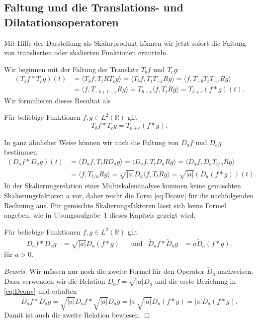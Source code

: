 \subsection{Faltung und die Translations- und Dilatationsoperatoren
\label{subsection:translation-und-dialatation}}
Mit Hilfe der Darstellung als Skalarprodukt können wir jetzt sofort
die Faltung von translierten oder skalierten Funktionen ermitteln.

Wir beginnen mit der Faltung der Translate $T_bf$ und $T_cg$:
\begin{align*}
(T_bf * T_cg)(t)
&=
\langle T_bf, T_tRT_cg\rangle
=
\langle T_bf, T_tT_{-c}Rg\rangle
=
\langle f, T_{-b}T_tT_{-c}Rg\rangle
\\
&=
\langle f, T_{-b+t-c}Rg\rangle
=
T_{b+c}
\langle f, T_tRg\rangle
=
T_{b+c}(f*g)(t).
\end{align*}
Wir formulieren dieses Resultat als

\begin{satz}
Für beliebige Funktionen $f,g\in L^2(\mathbb R)$ gilt
\begin{equation}
T_bf*T_cg
=
T_{b+c}(f*g).
\label{eq:Tconv}
\end{equation}
\end{satz}

In ganz ähnlicher Weise können wir auch die Faltung von
$D_af$ und $D_ag$ bestimmen:
\begin{align*}
(D_af * D_ag)(t)
&=
\langle D_af, T_tRD_ag\rangle
=
\langle D_af, T_tD_aRg\rangle
=
\langle D_af, D_aT_{t/a}Rg\rangle
\\
&=
\langle f, T_{t/a}Rg\rangle
=
\sqrt{|a|} D_a \langle f, T_t Rg\rangle
=
\sqrt{|a|}(D_a (f*g))(t).
\end{align*}
In der Skalierungsrelation einer Multiskalenanalyse kommen keine
gemischten Skalierungsfaktoren $a$ vor, daher reicht die Form
\eqref{eq:Dconv} für die nachfolgenden Rechnung aus.
Für gemischte Skalierungsfaktoren lässt sich keine Formel angeben,
wie in Übungsaufgabe~1 dieses Kapitels gezeigt wird.

\begin{satz}
\label{satz:faltung:Da}
Für beliebige Funktionen $f,g\in L^2(\mathbb R)$ gilt
\begin{align}
D_af * D_ag &= \sqrt{|a|}D_a(f*g)
&&\text{und}
&
\tilde{D}_af * \tilde{D}_ag &= a\tilde{D}_a(f*g).
\label{eq:Dconv}
\end{align}
für $a>0$.
\end{satz}

\begin{proof}[Beweis]
Wir müssen nur noch die zweite Formel für den Operator $\tilde{D}_a$
nachweisen.
Dazu verwenden wir die Relation $D_af = \sqrt{|a|}\tilde{D}_a$ und die
erste Beziehung in \eqref{eq:Dconv} und erhalten
\[
\tilde{D}_af * \tilde{D}_ag
=
\sqrt{|a|}D_af * \sqrt{|a|}D_ag
=
|a|
\sqrt{|a|}
D_a (f*g)
=
|a|
\tilde{D}_a(f*g).
\]
Damit ist auch die zweite Relation bewiesen.
\end{proof}



